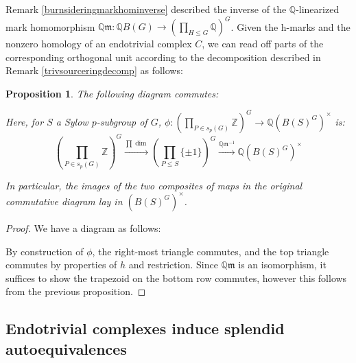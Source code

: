 \documentclass[10pt,letterpaper, boxed, cm]{amsart}
\newcommand{\Z}{\mathbb{Z}}
\newcommand{\Q}{\mathbb{Q}}
\newcommand{\inv}{^{-1}}
\newcommand{\calE}{\mathcal{E}}
\newtheorem{prop}[theorem]{Proposition}
\theoremstyle{remark}
\theoremstyle{definition}
\begin{document}
	Remark \ref{burnsideringmarkhominverse} described the inverse of the $\Q$-linearized mark homomorphism $\Q\mathfrak{m}: \Q B(G) \to \left(\prod_{H\leq G} \Q\right)^G$. Given the h-marks and the nonzero homology of an endotrivial complex $C$, we can read off parts of the corresponding orthogonal unit according to the decomposition described in Remark \ref{trivsourceringdecomp} as follows:

	\begin{prop}
		The following diagram commutes:
		\begin{figure}[H]
			\centering
		\end{figure}
		Here, for $S$ a Sylow $p$-subgroup of $G$, $\phi: \left(\prod_{P\in s_p(G)}\Z\right)^G \to \Q (B(S)^G)^\times$ is:
		\[\left(\prod_{P\in s_p(G)} \Z\right)^G \xrightarrow{\prod \dim}  \left(\prod_{P\leq S}\{\pm 1\} \right)^G \xrightarrow{\Q\mathfrak{m}\inv} \Q (B(S)^G)^\times\]

		In particular, the images of the two composites of maps in the original commutative diagram lay in $(B(S)^G)^\times$.
	\end{prop}
	\begin{proof}
		We have a diagram as follows:
		\begin{figure}[H]
			\centering
		\end{figure}
		By construction of $\phi$, the right-most triangle commutes, and the top triangle commutes by properties of $h$ and restriction. Since $\Q\mathfrak{m}$ is an isomorphism, it suffices to show the trapezoid on the bottom row commutes, however this follows from the previous proposition.
	\end{proof}

	\subsection{Endotrivial complexes induce splendid autoequivalences}
\end{document}
